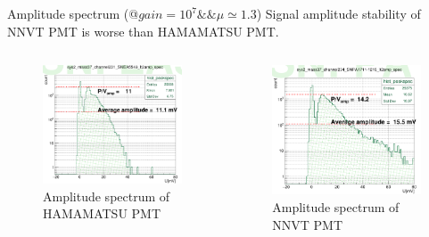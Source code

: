 \documentclass[11pt,compress,xcolor=x11names,UTF8]{beamer}
\begin{document}
\begin{frame}{Amplitude spectrum (@$gain=10^7\&\&\mu\simeq 1.3$)}
Signal amplitude stability of NNVT PMT is worse than HAMAMATSU PMT.
\vspace{-.3cm}
\begin{columns}
\begin{column}{.5\textwidth}
\begin{figure}
\centering
\includegraphics[width=\textwidth]{figures/hamampspe.png} %
\caption{Amplitude spectrum of HAMAMATSU PMT}
\end{figure}
\end{column}
\begin{column}{.5\textwidth}
\begin{figure}
\centering
\includegraphics[width=\textwidth]{figures/mcpampspe.png} %
\caption{Amplitude spectrum of NNVT PMT}
\end{figure}
\end{column}
\end{columns}
\end{frame}
\end{document}
